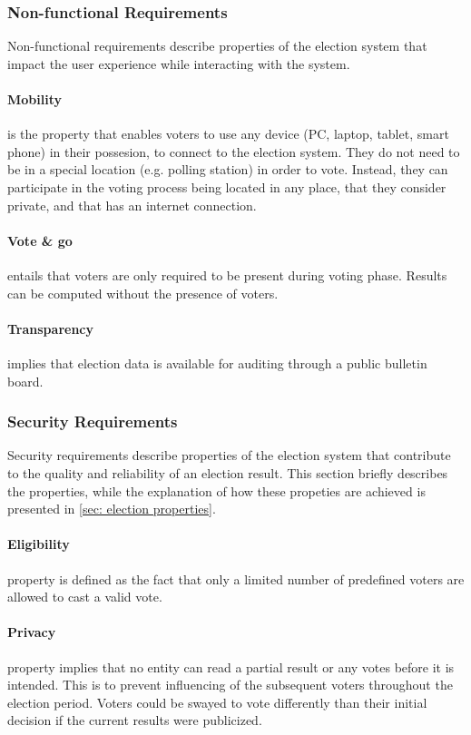 \subsubsection{Non-functional Requirements} \label{sec: non-functional requirements}
Non-functional requirements describe properties of the election system that impact the user experience while interacting with the system. 

\paragraph{Mobility} is the property that enables voters to use any device (PC, laptop, tablet, smart phone) in their possesion, to connect to the election system. They do not need to be in a special location (e.g. polling station) in order to vote. Instead, they can participate in the voting process being located in any place, that they consider private, and that has an internet connection.

\paragraph{Vote \& go} entails that voters are only required to be present during voting phase. Results can be computed without the presence of voters.

\paragraph{Transparency} implies that election data is available for auditing through a public bulletin board.


\subsubsection{Security Requirements} \label{sec: security requirements}
Security requirements describe properties of the election system that contribute to the quality and reliability of an election result. This section briefly describes the properties, while the explanation of how these propeties are achieved is presented in \cref{sec: election properties}.

\paragraph{Eligibility} property is defined as the fact that only a limited number of predefined voters are allowed to cast a valid vote. 

\paragraph{Privacy} property implies that no entity can read a partial result or any votes before it is intended. This is to prevent influencing of the subsequent voters throughout the election period. Voters could be swayed to vote differently than their initial decision if the current results were publicized.

